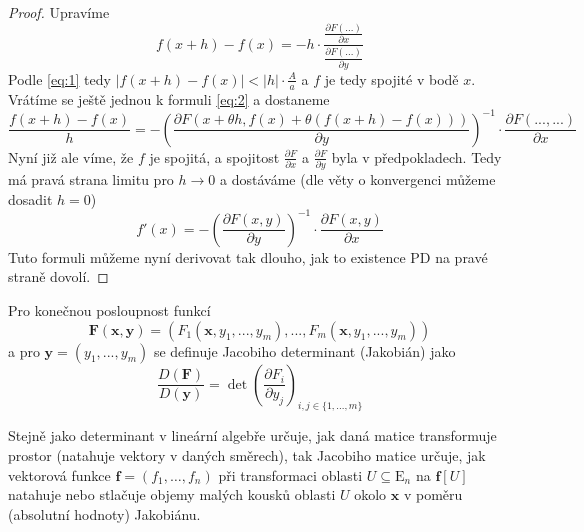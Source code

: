 \documentclass[../main.tex]{subfiles}
\begin{document}
\begin{proof}
	Upravíme
	\begin{equation} \label{eq:2}
		f(x + h) - f(x) = -h \cdot
		\frac{\frac{\partial F(...)}{\partial x}}
		{\frac{\partial F(...)}{\partial y}}
	\end{equation}
	Podle \ref{eq:1} tedy $|f(x + h) - f(x)| < |h| \cdot \frac{A}{a}$ a $f$
	je tedy spojité v bodě $x$. Vrátíme se ještě jednou k formuli
	\ref{eq:2} a dostaneme
	$$
	\frac{f(x + h) - f(x)}{h} = - \left ( \frac{\partial F (x + \theta h,
	f(x) + \theta (f(x + h) - f(x)))}{\partial y} \right)^{-1} \cdot
	\frac{\partial F(..., ...)}{\partial x}
	$$
	Nyní již ale víme, že $f$ je spojitá, a spojitost $\frac{\partial
	F}{\partial x}$ a $\frac{\partial F}{\partial y}$ byla v předpokladech.
	Tedy má pravá strana limitu pro $h \rightarrow 0$ a dostáváme
	(dle věty o konvergenci můžeme dosadit $h = 0$)
	$$
	f'(x) = - \left ( \frac{\partial F(x, y)}{\partial y} \right )^{-1}
	\cdot \frac{\partial F(x, y)}{\partial x}
	$$
	Tuto formuli můžeme nyní derivovat tak dlouho, jak to existence PD na
	pravé straně dovolí.
\end{proof}



\begin{definition}
	Pro konečnou posloupnost funkcí
	\[ \mathbf{F}(\mathbf{x}, \mathbf{y}) =
	(F_1(\mathbf{x}, y_1, ..., y_m), ... , F_m(\mathbf{x}, y_1, ..., y_m)) \]
	a pro $\mathbf{y} = (y_1, ... , y_m)$ se definuje Jacobiho determinant (Jakobián) jako
	\[ \frac{D(\mathbf{F})}{D(\mathbf{y})} =
	\det \left( \frac{\partial F_i}{\partial y_j} \right)_{i,j \in \{ 1, ... , m\}} \]
\end{definition}

\begin{intuition}
	Stejně jako determinant v lineární algebře určuje, jak daná matice transformuje prostor (natahuje vektory v daných směrech), tak Jacobiho matice určuje, jak vektorová funkce $\mathbf{f} = \left(f_1, \ldots, f_n\right)$ při transformaci oblasti $U \subseteq \mathrm{E}_n$ na $\mathbf{f}[U]$ natahuje nebo stlačuje objemy malých kousků oblasti $U$ okolo $\mathbf{x}$ v poměru (absolutní hodnoty) Jakobiánu.
\end{intuition}
\end{document}
